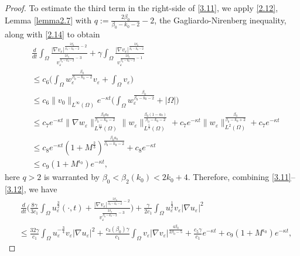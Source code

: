 \documentclass[12pt]{article}
\theoremstyle{plain}
\theoremstyle{definition}
\numberwithin{equation}{section}
\begin{document}
\begin{proof}
To estimate the third term in the right-side of \eqref{3.11}, we  apply \eqref{2.12}, Lemma \ref{lemma2.7} with $q:=\frac{2\beta_0}{\beta_0-k_0-2}-2$, the Gagliardo-Nirenberg inequality, along with \eqref{2.14} to obtain
    \begin{align}\label{3.12}
       & \frac{d}{dt}\int_{\Omega}
       \frac{
       |\nabla v_\varepsilon|^{
       \frac{2\beta_0}{\beta_0-k_0-2}-2}
       }
       {v_\varepsilon^{
       \frac{2\beta_0}{\beta_0-k_0-2}
       -3}}+
       \gamma \int_{\Omega}\frac{|\nabla v_\varepsilon|^{
       \frac{2\beta_0}{\beta_0-k_0-2}
       }}{v_\varepsilon^{
       \frac{2\beta_0}{\beta_0-k_0-2}
      -1}}\nonumber\\
        &\leq  c_6\bigg(\int_{\Omega}w_\varepsilon^{\frac{\beta_0}{\beta_0-k_0-2}}v_\varepsilon+\int_\Omega v_\varepsilon\bigg)\nonumber\\
        &\leq c_6 \|v_0\|_{L^{\infty}(\Omega)}e^{-\kappa t}\big(\int_\Omega w_\varepsilon^{\frac{\beta_0}{\beta_0-k_0-2}}+|\Omega|\big)\\
        &\leq c_7e^{-\kappa t}\|\nabla w_\varepsilon\|_{L^{\frac{11}{4}}(\Omega)}^{\frac{\beta_0 a_0}{\beta_0-k_0-2}}
        \|w_\varepsilon\|_{L^{\frac{5}{2}}(\Omega)}
        ^{\frac{\beta_0(1-a_0)}{\beta_0-k_0-2}}
        +c_7e^{-\kappa t}\|w_\varepsilon\|_{L^2(\Omega)}^{\frac{\beta_0}{\beta_0-k_0+2}}+c_7e^{-\kappa t}\nonumber\\
            &\leq c_8e^{-\kappa t}(1+M^{\frac{2}{3}})^{\frac{\beta_0 a_0}{\beta_0-k_0-2}}+c_8e^{-\kappa t}\nonumber\\
            &\leq c_9 (1+M^{\iota_0})e^{-\kappa t},\nonumber
    \end{align}
    here $q>2$ is warranted by $\beta_0<\beta_2(k_0)<2k_0+4$.
Therefore, combining \eqref{3.11}--\eqref{3.12}, we have
\begin{align}
&~\frac{d}{dt}\bigg(\frac{8\gamma}{3c_1}\int_\Omega u_\varepsilon^{\frac{3}{2}}(\cdot,t)+\frac{
       |\nabla v_\varepsilon|^{
       \frac{2\beta_0}{\beta_0-k_0-2}-2}}{v_\varepsilon^{
       \frac{2\beta_0}{\beta_0-k_0-2}
       -3}}\bigg)+\frac{\gamma}{2c_1}\int_\Omega u_\varepsilon^{\frac{1}{2}}v_\varepsilon|\nabla u_\varepsilon|^2\\
       &\leq \frac{32\gamma}{c_1} \int_\Omega u_\varepsilon^{-\frac{3}{4}}v_\varepsilon|\nabla u_\varepsilon|^2+\frac{c_3(\beta_0)\gamma}{c_1}\int_\Omega v_\varepsilon|\nabla v_\varepsilon|^{\frac{4\beta_0}{2\beta_0-5}}+\frac{c_5\gamma}{c_1}e^{-\kappa t}+c_9 (1+M^{\iota_0})e^{-\kappa t},\nonumber
\end{align}

\end{proof}
\end{document}

